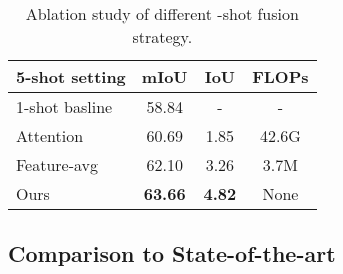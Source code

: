 \begin{table}[htbp]
\begin{center}
\begin{tabular}{|l|ccc|}
\hline
5-shot setting & mIoU & IoU & FLOPs \\ \hline \hline
1-shot basline &     58.84     &  -   & -      \\ \hline
Attention    & 60.69         & 1.85 & 42.6G      \\ \hline
Feature-avg     &  62.10        &  3.26   & 3.7M      \\ \hline
Ours      & \textbf{63.66}       & \textbf{4.82}    &  None     \\ \hline
\end{tabular}
\end{center}
\caption{Ablation study of different -shot fusion strategy.}
\label{k-shot}
\end{table}










\subsection{Comparison to State-of-the-art}

